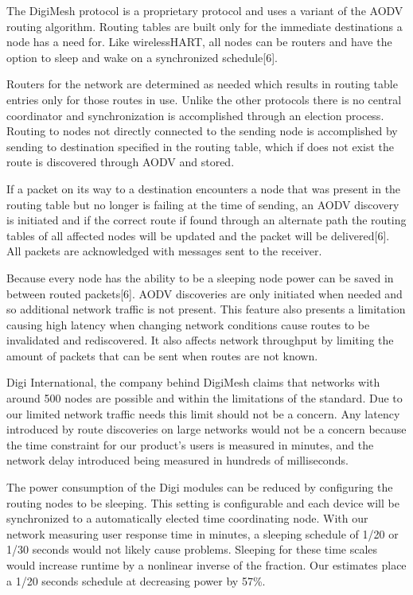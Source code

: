\documentclass[journal,compsoc]{IEEEtran}
\begin{document}
The DigiMesh protocol is a proprietary protocol and uses a variant of the AODV routing algorithm. Routing tables are built only for the immediate destinations a node has a need for.  Like wirelessHART, all nodes can be routers and have the option to sleep and wake on a synchronized schedule[6].

Routers for the network are determined as needed which results in routing table entries only for those routes in use. Unlike the other protocols there is no central coordinator and synchronization is accomplished through an election process.  Routing to nodes not directly connected to the sending node is accomplished by sending to destination specified in the routing table, which if does not exist the route is discovered through AODV and stored.

If a packet on its way to a destination encounters a node that was present in the routing table but no longer is failing at the time of sending, an AODV discovery is initiated and if the correct route if found through an alternate path the routing tables of all affected nodes will be updated and the packet will be delivered[6].  All packets are acknowledged with messages sent to the receiver.

Because every node has the ability to be a sleeping node power can be saved in between routed packets[6].  AODV discoveries are only initiated when needed and so additional network traffic is not present.  This feature also presents a limitation causing high latency when changing network conditions cause routes to be invalidated and rediscovered. It also affects network throughput by limiting the amount of packets that can be sent when routes are not known.

Digi International, the company behind DigiMesh claims that networks with around 500 nodes are possible and within the limitations of the standard.  Due to our limited network traffic needs this limit should not be a concern.  Any latency introduced by route discoveries on large networks would not be a concern because the time constraint for our product’s users is measured in minutes, and the network delay introduced being measured in hundreds of milliseconds.

The power consumption of the Digi modules can be reduced by configuring the routing nodes to be sleeping.  This setting is configurable and each device will be synchronized to a automatically elected time coordinating node.  With our network measuring user response time in minutes, a sleeping schedule of 1/20 or 1/30 seconds would not likely cause problems.  Sleeping for these time scales would increase runtime by a nonlinear inverse of the fraction. Our estimates place a 1/20 seconds schedule at decreasing power by 57\%.
\end{document}
